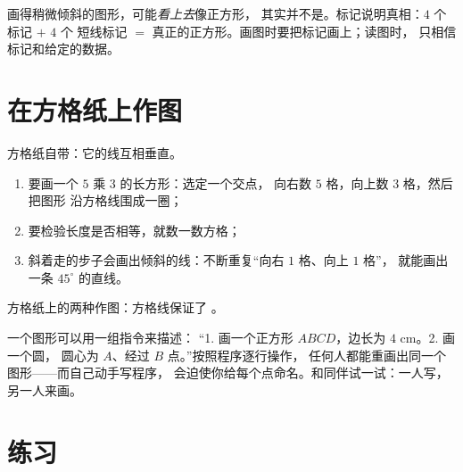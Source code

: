 \begin{example}[标记为何重要]\label{ex:g3:shapes:marks}
画得稍微倾斜的图形，可能\emph{看上去}像正方形，
其实并不是。标记说明真相：$4$ 个标记 $+$ $4$ 个
短线标记 $=$ 真正的正方形。画图时要把标记画上；读图时，
只相信标记和给定的数据。
\end{example}

\section{在方格纸上作图}

\begin{method}[方格中的作图]\label{met:g3:shapes:grid}
方格纸自带：它的线互相垂直。
\begin{enumerate}
  \item 要画一个 $5$ 乘 $3$ 的长方形：选定一个交点，
        向右数 $5$ 格，向上数 $3$ 格，然后把图形
        沿方格线围成一圈；
  \item 要检验长度是否相等，就数一数方格；
  \item 斜着走的步子会画出倾斜的线：不断重复“向右 $1$ 格、向上 $1$ 格”，
        就能画出一条 $45^\circ$ 的直线。
\end{enumerate}
\end{method}

\begin{omfigure}

{\small 方格纸上的两种作图：方格线保证了
。}
\end{omfigure}

\begin{example}[作图程序]\label{ex:g3:shapes:program}
一个图形可以用一组指令来描述：
“1. 画一个正方形 $ABCD$，边长为 $4$ cm。2. 画一个圆，
圆心为 $A$、经过 $B$ 点。”按照程序逐行操作，
任何人都能重画出同一个图形——而自己动手写程序，
会迫使你给每个点命名。和同伴试一试：一人写，
另一人来画。
\end{example}

\section{练习}

